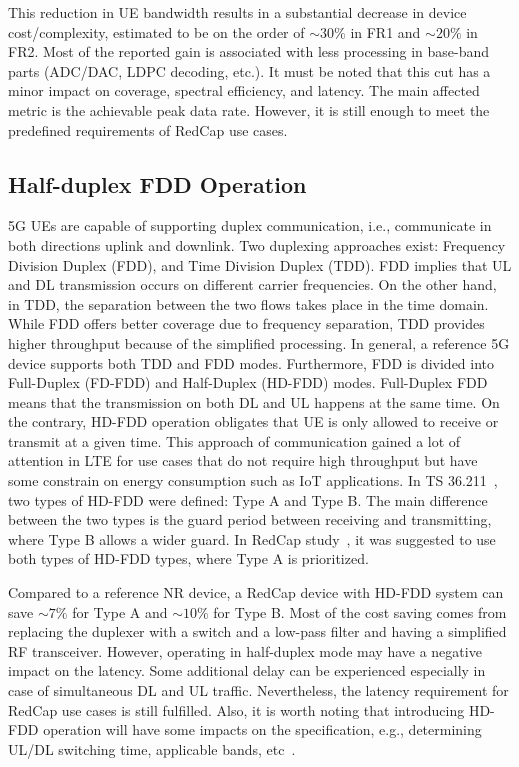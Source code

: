 \documentclass[]{IEEEtran}
\begin{document}
This reduction in UE bandwidth results in a substantial decrease in device cost/complexity, estimated to be on the order of $\sim30\%$ in FR1 and $\sim20\%$ in  FR2.
Most of the reported gain is associated with less processing in base-band parts (ADC/DAC, LDPC decoding, etc.).
It must be noted that this cut has a minor impact on coverage, spectral efficiency, and latency.
The main affected metric is the achievable peak data rate.
However, it is still enough to meet the predefined requirements of RedCap use cases.

\subsection{Half-duplex FDD Operation}
\label{sec:4-3}
5G UEs are capable of supporting duplex communication, i.e., communicate in both directions uplink and downlink.
Two duplexing approaches exist: Frequency Division Duplex (FDD), and Time Division Duplex (TDD).
FDD implies that UL and DL transmission occurs on different carrier frequencies.
On the other hand, in TDD, the separation between the two flows takes place in the time domain.
While FDD offers better coverage due to frequency separation, TDD provides higher throughput because of the simplified processing.
In general, a reference 5G device supports both TDD and FDD modes.
Furthermore, FDD is divided into Full-Duplex (FD-FDD) and Half-Duplex (HD-FDD) modes. 
Full-Duplex FDD means that the transmission on both DL and UL happens at the same time.
On the contrary, HD-FDD operation obligates that UE is only allowed to receive or transmit at a given time.
This approach of communication gained a lot of attention in LTE for use cases that do not require high throughput but have some constrain on energy consumption such as IoT applications.
In TS 36.211~\cite{3gpp_evolved_nodate_36.211}, two types of HD-FDD were defined: Type A and Type B.
The main difference between the two types is the guard period between receiving and transmitting, where Type B allows a wider guard.
In RedCap study~\cite{3gpp_study_2021_38.875}, it was suggested to use both types of HD-FDD types, where Type A is prioritized.

Compared to a reference NR device, a RedCap device with HD-FDD system can save $\sim7\%$ for Type A and $\sim10\%$ for Type B.
Most of the cost saving comes from replacing the duplexer with a switch and a low-pass filter and having a simplified RF transceiver.
However, operating in half-duplex mode may have a negative impact on the latency.
Some additional delay can be experienced especially in case of simultaneous DL and UL traffic.
Nevertheless, the latency requirement for RedCap use cases is still fulfilled.
Also, it is worth noting that introducing HD-FDD operation will have some impacts on the specification, e.g., determining UL/DL switching time, applicable bands, etc~\cite{ratasuk_reduced_2021}. 
\end{document}
